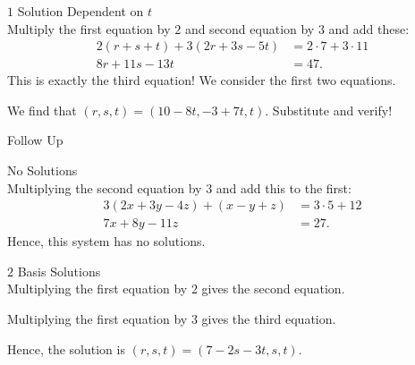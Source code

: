 \documentclass[xcolor=dvipsnames, fontsize=11pt, %
pagesize, %
parskip=half-, t]{beamer}
\begin{document}
\begin{frame}{$1$ Solution Dependent on $t$}
 ~\\
Multiply the first equation by $2$ and second equation by $3$ and add these: \begin{align*} 2\left(r+s+t\right)+3\left(2r+3s-5t\right)&=2\cdot 7+3\cdot 11 \\
8r+11s-13t&=47. \end{align*}
This is exactly the third equation! We consider the first two equations. \medskip 

We find that $(r, s, t)=(10-8t, -3+7t, t)$. Substitute and verify!		
\end{frame}

\begin{frame}[c]{Follow Up}
	\centering
\end{frame}

\begin{frame}{No Solutions}
	 ~\\
		
		Multiplying the second equation by $3$ and add this to the first:
		\begin{align*} 3\left(2x+3y-4z\right)+\left(x-y+z\right)&=3\cdot 5+12 \\
					7x+8y-11z &=27. \end{align*}
		Hence, this system has no solutions.
\end{frame}

\begin{frame}{$2$ Basis Solutions}
	 ~\\
			
Multiplying the first equation by $2$ gives the second equation. \medskip \pause

Multiplying the first equation by $3$ gives the third equation. \medskip \pause

Hence, the solution is $(r, s, t)=(7-2s-3t, s, t)$. 
\end{frame}
\end{document}
